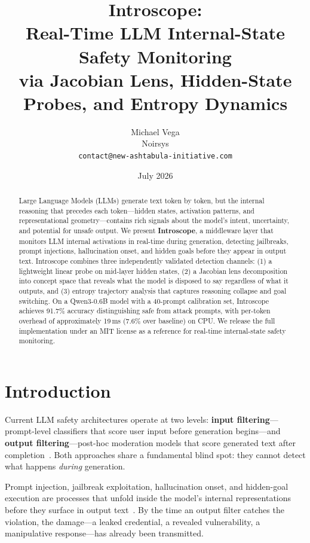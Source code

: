 \documentclass[11pt,twocolumn]{article}
\title{Introscope:\\[4pt]
Real-Time LLM Internal-State Safety Monitoring\\
via Jacobian Lens, Hidden-State Probes, and Entropy Dynamics}
\author{Michael Vega \\ Noirsys \\ \texttt{contact@new-ashtabula-initiative.com}}
\date{July 2026}
\begin{document}
\maketitle

\begin{abstract}
Large Language Models (LLMs) generate text token by token, but the internal reasoning that precedes each token---hidden states, activation patterns, and representational geometry---contains rich signals about the model's intent, uncertainty, and potential for unsafe output. We present \textbf{Introscope}, a middleware layer that monitors LLM internal activations in real-time during generation, detecting jailbreaks, prompt injections, hallucination onset, and hidden goals before they appear in output text. Introscope combines three independently validated detection channels: (1) a lightweight linear probe on mid-layer hidden states, (2) a Jacobian lens decomposition into concept space that reveals what the model is disposed to say regardless of what it outputs, and (3) entropy trajectory analysis that captures reasoning collapse and goal switching. On a Qwen3-0.6B model with a 40-prompt calibration set, Introscope achieves 91.7\% accuracy distinguishing safe from attack prompts, with per-token overhead of approximately 19\,ms (7.6\% over baseline) on CPU. We release the full implementation under an MIT license as a reference for real-time internal-state safety monitoring.
\end{abstract}

\section{Introduction}

\label{sec:introduction}

Current LLM safety architectures operate at two levels: \textbf{input filtering}---prompt-level classifiers that score user input before generation begins---and \textbf{output filtering}---post-hoc moderation models that score generated text after completion~\cite{llamaguard,wildguard}. Both approaches share a fundamental blind spot: they cannot detect what happens \emph{during} generation.

Prompt injection, jailbreak exploitation, hallucination onset, and hidden-goal execution are processes that unfold inside the model's internal representations before they surface in output text~\cite{anthropic2026workspace}. By the time an output filter catches the violation, the damage---a leaked credential, a revealed vulnerability, a manipulative response---has already been transmitted.
\end{document}
